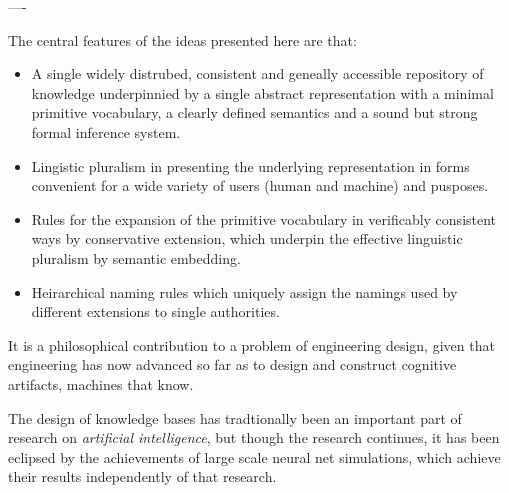 ----


The central features of the ideas presented here are that:
\begin{itemize}
\item A single widely distrubed, consistent and geneally accessible repository of knowledge underpinnied by a single abstract representation with a minimal primitive vocabulary, a clearly defined semantics and a sound but strong formal inference system.
\item Lingistic pluralism in presenting the underlying representation in forms convenient for a wide variety of users (human and machine) and pusposes.
\item Rules for the expansion of the primitive vocabulary in verificably consistent ways by conservative extension, which underpin the effective linguistic pluralism by semantic embedding.
\item Heirarchical naming rules which uniquely assign the namings used by different extensions to single authorities.


\end{itemize}


It is a philosophical contribution to a problem of engineering design, given that engineering has now advanced so far as to design and construct cognitive artifacts, machines that know.

The design of knowledge bases has tradtionally been an important part of research on \emph{artificial intelligence}, but though the research continues, it has been eclipsed by the achievements of large scale neural net simulations, which achieve their results independently of that research.
